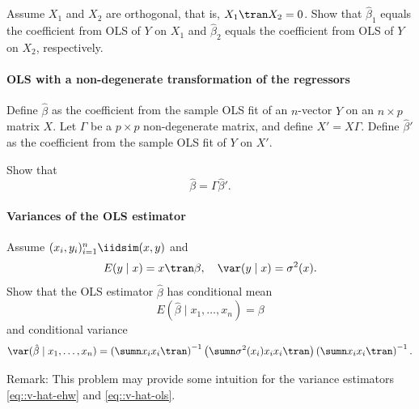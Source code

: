 Assume $X_1$ and $X_2$ are orthogonal, that is, $X_1\tran X_2 = 0$. Show that $\hat{\beta}_1$ equals the coefficient from OLS of $Y$ on $X_1$ and $\hat{\beta}_2$ equals the coefficient from OLS of $Y$ on $X_2$, respectively. 





\paragraph{OLS with a non-degenerate transformation of the regressors}\label{hw::ols-transform-regressors}



Define $\hat{\beta}$ as the coefficient from the sample OLS fit of an $n$-vector $Y$ on an $n\times p$ matrix $X $. 
Let $\Gamma$ be a $p\times p$ non-degenerate matrix, and define $X' = X\Gamma$. 
Define $\hat{\beta} ' $ as the coefficient from the sample OLS fit of  $Y$ on $X' $. 

Show that 
$$
 \hat{\beta}  =  \Gamma\hat{\beta} ' .
$$



\paragraph{Variances of the OLS estimator}\label{hw::variance-ols-estimator}


Assume $(x_{i},y_{i})_{i=1}^{n} \iidsim (x,y)$ and 
$$
E(y\mid x) = x\tran \beta,\quad \var(y\mid x) = \sigma^2(x).
$$
Show that the OLS estimator $\hat{\beta}$ has conditional mean
$$
E( \hat{\beta} \mid x_1,\ldots, x_n ) = \beta 
$$
and conditional variance
$$
\var( \hat{\beta} \mid x_1,\ldots, x_n )
= \left(\sumn x_{i}x_{i} \tran \right)^{-1}
\left(\sumn \sigma^2(x_i) x_{i}x_{i} \tran \right)
\left(\sumn x_{i}x_{i} \tran \right)^{-1}.
$$

 


Remark: This problem may provide some intuition for the variance estimators
\eqref{eq::v-hat-ehw} and \eqref{eq::v-hat-ols}.

